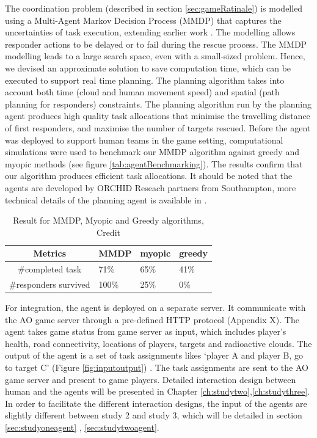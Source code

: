 The coordination problem (described in section \ref{sec:gameRatinale}) is modelled using a Multi-Agent Markov Decision Process (MMDP) that captures the uncertainties of task execution, extending earlier work \cite{Wu2015}. The modelling allows responder actions to be delayed or to fail during the rescue process. The MMDP modelling leads to a large search space, even with a small-sized problem. Hence, we devised an approximate solution to save computation time, which can be executed to support real time planning. The planning algorithm takes into account both time (cloud and human movement speed) and spatial (path planning for responders) constraints. The planning algorithm run by the planning agent produces high quality task allocations that minimise the travelling distance of first responders, and maximise the number of targets rescued. Before the agent was deployed to support human teams in the game setting, computational simulations were used to benchmark our MMDP algorithm against greedy and myopic methods (see figure \ref{tab:agentBenchmarking}). The results confirm that our algorithm produces efficient task allocations. It should be noted that the agents are developed by ORCHID Reseach partners from Southampton, more technical details of the planning agent is available in \cite{Ramchurn2015a}.\\


\begin{table}[h]
\centering
\begin{tabular}{c|lll}
Metrics               & MMDP  & myopic & greedy \\ \hline
\#completed task      & 71\%  & 65\%   & 41\%   \\
\#responders survived & 100\% & 25\%   & 0\%   
\end{tabular}
\caption{Result for MMDP, Myopic and Greedy algorithms, Credit \cite{Ramchurn2015a}}
\label{fig:agentBenchmarking}
\end{table}

For integration, the agent is deployed on a separate server. It communicate with the \ac{AO} game server through a pre-defined HTTP protocol (Appendix X). The agent takes game status from game server as input, which includes player's health, road connectivity, locations of players, targets and radioactive clouds. The output of the agent is a set of task assignments likes `player A and player B, go to target C' (Figure \ref{fig:inputoutput}) . The task assignments are sent to the \ac{AO} game server and present to game players. Detailed interaction design between human and the agents will be presented in Chapter \ref{ch:studytwo},\ref{ch:studythree}. In order to facilitate the different interaction designs, the input of the agents are slightly different between study 2 and study 3, which will be detailed in section \ref{sec:studyoneagent} , \ref{sec:studytwoagent}. \\

